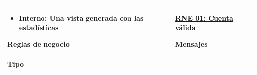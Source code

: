 \begin{center}
\begin{longtable}{| p{3.5cm} | p{11.5cm} |}
              \begin{itemize}
                \item \textbf{Interno:} Una vista generada con las estadísticas
              \end{itemize}
        \hline
          \textbf{Reglas de negocio} & 
              \begin{itemsize}
                 \item {\hyperref[rnr_01]{RNE 01: Cuenta válida}}
              \end{itemsize}
        \hline
          \textbf{Mensajes} & \\
        \hline
          \textbf{Tipo} & \\
        \hline      
  \end{longtable}
\end{center}
\endgroup

